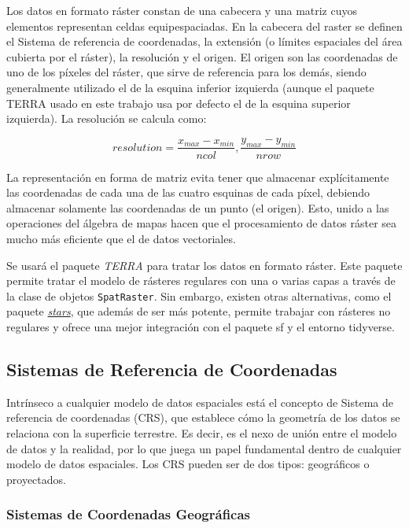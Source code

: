 \documentclass[12pt,a4paper,]{book}
\numberwithin{dummy}{section}
\theoremstyle{ocrenumbox}
\theoremstyle{blacknumex}
\theoremstyle{blacknumbox}
\theoremstyle{ocrenum}
\theoremstyle{ocrenum}
\begin{document}
Los datos en formato ráster constan de una cabecera y una matriz cuyos
elementos representan celdas equipespaciadas. En la cabecera del raster
se definen el Sistema de referencia de coordenadas, la extensión (o
límites espaciales del área cubierta por el ráster), la resolución y el
origen. El origen son las coordenadas de uno de los píxeles del ráster,
que sirve de referencia para los demás, siendo generalmente utilizado el
de la esquina inferior izquierda (aunque el paquete TERRA usado en este
trabajo usa por defecto el de la esquina superior izquierda). La
resolución se calcula como:

\[ resolution = \frac{x_{max}-x_{min}}{ncol},\frac{y_{max}-y_{min}}{nrow} \]

La representación en forma de matriz evita tener que almacenar
explícitamente las coordenadas de cada una de las cuatro esquinas de
cada píxel, debiendo almacenar solamente las coordenadas de un punto (el
origen). Esto, unido a las operaciones del álgebra de mapas hacen que el
procesamiento de datos ráster sea mucho más eficiente que el de datos
vectoriales.

Se usará el paquete \emph{TERRA} para tratar los datos en formato
ráster. Este paquete permite tratar el modelo de rásteres regulares con
una o varias capas a través de la clase de objetos \texttt{SpatRaster}.
Sin embargo, existen otras alternativas, como el paquete
\href{https://cran.r-project.org/web/packages/stars/index.html}{\it stars},
que además de ser más potente, permite trabajar con rásteres no
regulares y ofrece una mejor integración con el paquete sf y el entorno
tidyverse.

\hypertarget{sistemas-de-referencia-de-coordenadas}{%
\subsection{Sistemas de Referencia de
Coordenadas}\label{sistemas-de-referencia-de-coordenadas}}

Intrínseco a cualquier modelo de datos espaciales está el concepto de
Sistema de referencia de coordenadas (CRS), que establece cómo la
geometría de los datos se relaciona con la superficie terrestre. Es
decir, es el nexo de unión entre el modelo de datos y la realidad, por
lo que juega un papel fundamental dentro de cualquier modelo de datos
espaciales. Los CRS pueden ser de dos tipos: geográficos o proyectados.

\hypertarget{sistemas-de-coordenadas-geogruxe1ficas}{%
\subsubsection{Sistemas de Coordenadas
Geográficas}\label{sistemas-de-coordenadas-geogruxe1ficas}}
\end{document}

